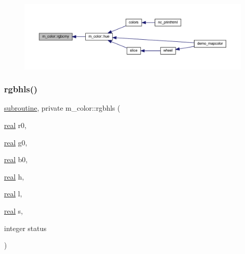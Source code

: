 \nopagebreak
\begin{figure}[H]
\begin{center}
\leavevmode
\includegraphics[width=350pt]{namespacem__color_ad6e8505eef5add299c4475d289f3c5c5_icgraph}
\end{center}
\end{figure}
\mbox{\label{namespacem__color_a1dd027cbe65112af243d26195b1fc49a}} 
\subsubsection{\texorpdfstring{rgbhls()}{rgbhls()}}
{\footnotesize\ttfamily \hyperlink{M__stopwatch_83_8txt_acfbcff50169d691ff02d4a123ed70482}{subroutine}, private m\+\_\+color\+::rgbhls (\begin{DoxyParamCaption}\item[{\hyperlink{read__watch_83_8txt_abdb62bde002f38ef75f810d3a905a823}{real}}]{r0,  }\item[{\hyperlink{read__watch_83_8txt_abdb62bde002f38ef75f810d3a905a823}{real}}]{g0,  }\item[{\hyperlink{read__watch_83_8txt_abdb62bde002f38ef75f810d3a905a823}{real}}]{b0,  }\item[{\hyperlink{read__watch_83_8txt_abdb62bde002f38ef75f810d3a905a823}{real}}]{h,  }\item[{\hyperlink{read__watch_83_8txt_abdb62bde002f38ef75f810d3a905a823}{real}}]{l,  }\item[{\hyperlink{read__watch_83_8txt_abdb62bde002f38ef75f810d3a905a823}{real}}]{s,  }\item[{integer}]{status }\end{DoxyParamCaption})\hspace{0.3cm}{\ttfamily [private]}}


